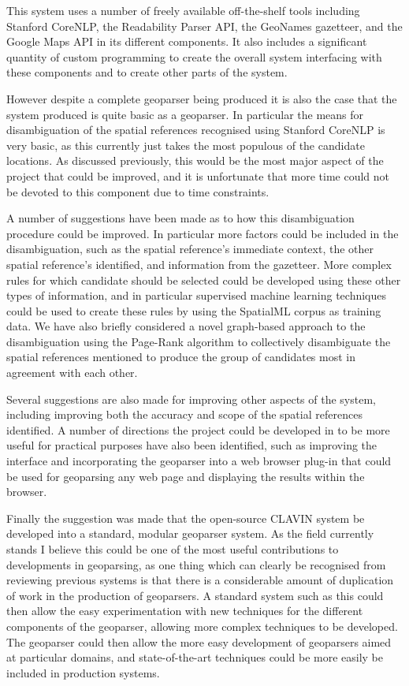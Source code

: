 \documentclass[12pt, a4paper]{report}
\begin{document}
This system uses a number of freely available off-the-shelf tools including Stanford CoreNLP, the Readability Parser API, the GeoNames gazetteer, and the Google Maps API in its different components. It also includes a significant quantity of custom programming to create the overall system interfacing with these components and to create other parts of the system.

However despite a complete geoparser being produced it is also the case that the system produced is quite basic as a geoparser. In particular the means for disambiguation of the spatial references recognised using Stanford CoreNLP is very basic, as this currently just takes the most populous of the candidate locations. As discussed previously, this would be the most major aspect of the project that could be improved, and it is unfortunate that more time could not be devoted to this component due to time constraints.

A number of suggestions have been made as to how this disambiguation procedure could be improved. In particular more factors could be included in the disambiguation, such as the spatial reference's immediate context, the other spatial reference's identified, and information from the gazetteer. More complex rules for which candidate should be selected could be developed using these other types of information, and in particular supervised machine learning techniques could be used to create these rules by using the SpatialML corpus as training data. We have also briefly considered a novel graph-based approach to the disambiguation using the Page-Rank algorithm \citep{alhelbawy2014} to collectively disambiguate the spatial references mentioned to produce the group of candidates most in agreement with each other.

Several suggestions are also made for improving other aspects of the system, including improving both the accuracy and scope of the spatial references identified. A number of directions the project could be developed in to be more useful for practical purposes have also been identified, such as improving the interface and incorporating the geoparser into a web browser plug-in that could be used for geoparsing any web page and displaying the results within the browser.

Finally the suggestion was made that the open-source CLAVIN system be developed into a standard, modular geoparser system. As the field currently stands I believe this could be one of the most useful contributions to developments in geoparsing, as one thing which can clearly be recognised from reviewing previous systems is that there is a considerable amount of duplication of work in the production of geoparsers. A standard system such as this could then allow the easy experimentation with new techniques for the different components of the geoparser, allowing more complex techniques to be developed. The geoparser could then allow the more easy development of geoparsers aimed at particular domains, and state-of-the-art techniques could be more easily be included in production systems.  







\end{document}
